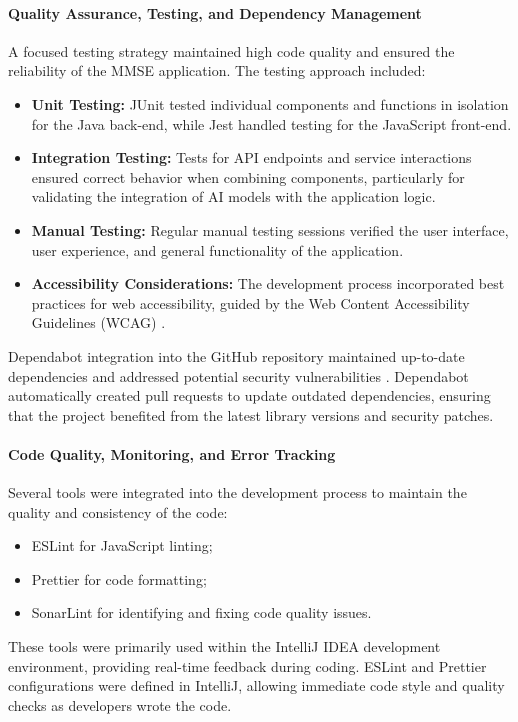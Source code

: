 \paragraph{Quality Assurance, Testing, and Dependency Management}
A focused testing strategy maintained high code quality and ensured the reliability of the MMSE application. The testing approach included:
\begin{itemize}
\item \textbf{Unit Testing:} JUnit tested individual components and functions in isolation for the Java back-end, while Jest handled testing for the JavaScript front-end.
\item \textbf{Integration Testing:} Tests for API endpoints and service interactions ensured correct behavior when combining components, particularly for validating the integration of AI models with the application logic.
\item \textbf{Manual Testing:} Regular manual testing sessions verified the user interface, user experience, and general functionality of the application.
\item \textbf{Accessibility Considerations:} The development process incorporated best practices for web accessibility, guided by the Web Content Accessibility Guidelines (WCAG) \cite{wcag}.
\end{itemize}

Dependabot integration into the GitHub repository maintained up-to-date dependencies and addressed potential security vulnerabilities \cite{dependabot}. Dependabot automatically created pull requests to update outdated dependencies, ensuring that the project benefited from the latest library versions and security patches.

\paragraph{Code Quality, Monitoring, and Error Tracking}
Several tools were integrated into the development process to maintain the quality and consistency of the code:
\begin{itemize}
\item ESLint for JavaScript linting;
\item Prettier for code formatting;
\item SonarLint for identifying and fixing code quality issues.
\end{itemize}

These tools were primarily used within the IntelliJ IDEA development environment, providing real-time feedback during coding. ESLint and Prettier configurations were defined in IntelliJ, allowing immediate code style and quality checks as developers wrote the code.

